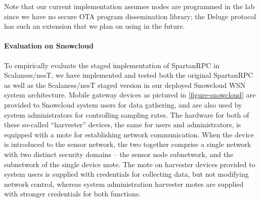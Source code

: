 
Note that our current implementation assumes nodes are programmed in the lab since we have no
secure OTA program dissemination library; the Deluge protocol has such an extension
\cite{Dutta:2006:SDN:1127777.1127826} that we plan on using in the future.

\spartanrpcfig

\paragraph{Evaluation on Snowcloud} To empirically evaluate the staged implementation of
SpartanRPC in Scalaness/nesT, we have implemented and tested both the original SpartanRPC as
well as the Scalaness/nesT staged version in our deployed Snowcloud WSN system architecture.
Mobile gateway devices as pictured in \autoref{figure-snowcloud} are provided to Snowcloud
system users for data gathering, and are also used by system administrators for controlling
sampling rates. The hardware for both of these so-called ``harvester'' devices, the same for
users and administrators, is equipped with a mote for establishing network communication. When
the device is introduced to the sensor network, the two together comprise a single network with
two distinct security domains -- the sensor node subnetwork, and the subnetwork of the single
device mote. The mote on harvester devices provided to system users is supplied with credentials
for collecting data, but not modifying network control, whereas system administration harvester
motes are supplied with stronger credentials for both functions.


